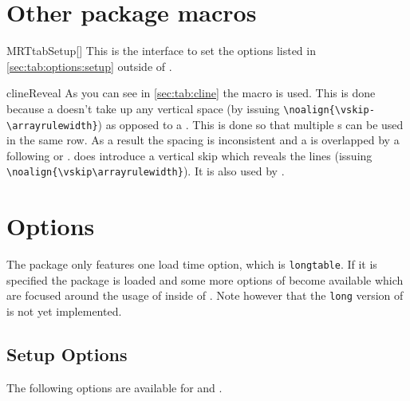 \section{Other package macros}%
\begin{describemacro}{MRTtabSetup}[]
  This is the interface to set the options listed in
  \autoref{sec:tab:options:setup} outside of .
\end{describemacro}

\begin{describemacro}{clineReveal}
  As you can see in \autoref{sec:tab:cline} the macro  is used.
  This is done because a  doesn't take up any vertical space (by
  issuing \verb|\noalign{\vskip-\arrayrulewidth}|) as opposed to a .
  This is done so that multiple s can be used in the same row. As a
  result the spacing is inconsistent and a  is overlapped by a
  following  or .  does introduce a
  vertical skip which reveals the lines (issuing
  \verb|\noalign{\vskip\arrayrulewidth}|).  It is also used by .
\end{describemacro}

\section{Options}\label{sec:tab:options}%
The package only features one load time option, which is \texttt{longtable}. If
it is specified the  package is loaded and some more options of
 become available which are focused around the usage of
 inside of . Note however that the \texttt{long}
version of  is not yet implemented.

\subsection{Setup Options}\label{sec:tab:options:setup}
The following options are available for  and .


